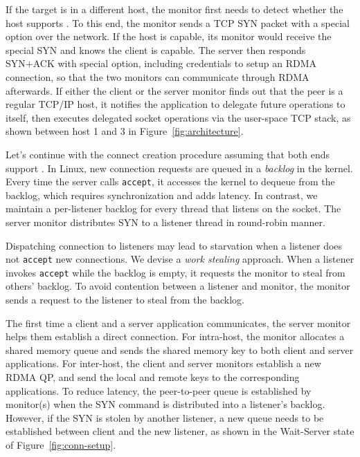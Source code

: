If the target is in a different host, the monitor first needs to detect whether the host supports \sys{}.
To this end, the monitor sends a TCP SYN packet with a special option over the network.
If the host is \sys{} capable, its monitor would receive the special SYN and knows the client is \sys{} capable.
The server then responds SYN+ACK with special option, including credentials to setup an RDMA connection, so that the two monitors can communicate through RDMA afterwards.
If either the client or the server monitor finds out that the peer is a regular TCP/IP host, it notifies the application to delegate future operations to itself, 
then executes delegated socket operations via the user-space TCP stack, as shown between host 1 and 3 in Figure~\ref{fig:architecture}.

Let's continue with the connect creation procedure assuming that both ends support \sys{}.
In Linux, new connection requests are queued in a \emph{backlog} in the kernel.
Every time the server calls \texttt{accept}, it accesses the kernel to dequeue from the backlog, which requires synchronization and adds latency.
In contrast, we maintain a per-listener backlog for every thread that listens on the socket.
The server monitor distributes SYN to a listener thread in round-robin manner.

Dispatching connection to listeners may lead to starvation when a listener does not \texttt{accept} new connections.
We devise a \textit{work stealing} approach.
When a listener invokes \texttt{accept} while the backlog is empty, it requests the monitor to steal from others' backlog.
To avoid contention between a listener and monitor, the monitor sends a request to the listener to steal from the backlog.

The first time a client and a server application communicates, the server monitor helps them establish a direct connection.
For intra-host, the monitor allocates a shared memory queue and sends the shared memory key to both client and server applications.
For inter-host, the client and server monitors establish a new RDMA QP, and send the local and remote keys to the corresponding applications.
To reduce latency, the peer-to-peer queue is established by monitor(s) when the SYN command is distributed into a listener's backlog.
However, if the SYN is stolen by another listener, a new queue needs to be established between client and the new listener, as shown in the Wait-Server state of Figure~\ref{fig:conn-setup}.

